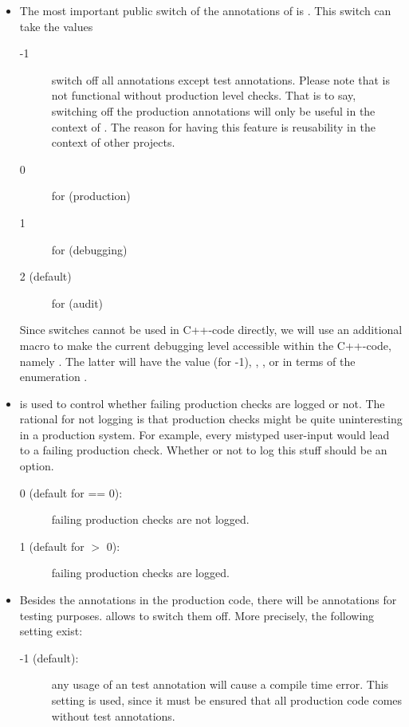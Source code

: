 \begin{itemize}
\item The most important public switch of the annotations of \SYNEIGHT is
  \SwitchBuildLevel. This switch can take the values
  \begin{description}
  \item[-1] switch off all annotations except test annotations. Please
    note that \SYNEIGHT is not functional without production level
    checks. That is to say, switching off the production annotations
    will only be useful in the context of \SYNEIGHT. The reason for
    having this feature is reusability in the context of other
    projects.
  \item[0] for \ProLevel (production)
  \item[1] for \DebLevel (debugging)
  \item[2 (default)] for \AudLevel (audit)
  \end{description}
  Since switches cannot be used in C++-code directly, we will use an
  additional macro to make the current debugging level accessible
  within the C++-code, namely \BuildLevel. The latter will have the
  value \SysLevel (for -1), \ProLevel, \DebLevel, or \AudLevel in
  terms of the enumeration \VerbosityLevelType.
\item \SwitchLogProChecks is used to control whether failing
  production checks are logged or not. The rational for not logging is
  that production checks might be quite uninteresting in a production
  system. For example, every mistyped user-input would lead to a
  failing production check. Whether or not to log this stuff should be
  an option.
  \begin{description}
  \item[0 (default for \SwitchBuildLevel == 0):] failing production checks are not logged.
  \item[1 (default for \SwitchBuildLevel $>$ 0):] failing production checks are logged.
  \end{description}
\item Besides the annotations in the production code, there will be
  annotations for testing purposes. \SwitchTestAnnotations allows to
  switch them off. More precisely, the following setting exist:
  \begin{description}
  \item[-1 (default):] any usage of an test annotation will cause a compile time
    error. This setting is used, since it must be ensured that all
    production code comes without test annotations.

\end{description}
\end{itemize}
